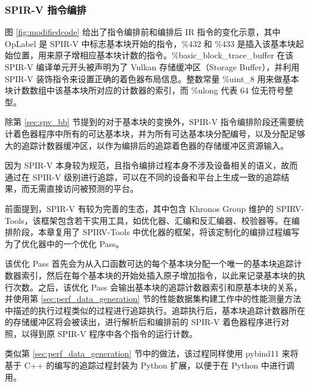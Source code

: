 \subsubsection{SPIR-V 指令编排}
\label{subsec:spv_instrumentation}

图 \ref{fig:modifiedcode} 给出了指令编排前和编排后 IR 指令的变化{\amend 示意}，其中 OpLabel 是 SPIR-V 中标志基本块开始的指令，\%432 和 \%433 是插入该基本块起始位置，用来原子增相应基本块计数的指令。\%basic\_block\_trace\_buffer 在该 SPIR-V 编译单元开头被声明为了 Vulkan 存储缓冲区（Storage Buffer），并利用 SPIR-V 装饰指令来设置正确的着色器布局信息。整数常量 \%uint\_8 用来做基本块计数数组中该基本块所对应的计数器的索引，而 \%ulong 代表 64 位无符号整型。

除第 \ref{sec:spv_bb} 节提到的对于基本块的变换外，SPIR-V 指令编排阶段还需要统计着色器程序中所有的可达基本块，并为所有可达基本块分配编号，以及分配足够大的追踪计数器缓冲区，以作为编排后的追踪着色器的存储缓冲区资源输入。

因为 SPIR-V 本身较为规范，且指令编排过程本身不涉及设备相关的语义，故而通过在 SPIR-V 级别进行追踪，可以在不同的设备和平台上生成一致的追踪结果，而无需直接访问被预测的平台。

前面提到，SPIR-V 有较为完善的生态，其中包含 Khronos Group 维护的 SPIRV-Tools，该框架包含若干实用工具，如优化器、汇编和反汇编器、校验器等。在编排阶段，本章复用了 SPIRV-Tools 中优化器的框架，将该定制化的编排过程{\amend 编写为了}优化器中的一个优化 Pass。

{\amend 该优化 Pass 首先会}为从入口函数可达的每个基本块分配一个唯一的基本块追踪计数器索引，然后在每个基本块的开始处插入原子增加指令，以此来记录基本块的执行次数。之后，该优化 Pass 会输出基本块的追踪计数器索引和原基本块的关系，并使用第 \ref{sec:perf_data_generation} 节{\amend 的性能数据集构建工作中}的性能测量方法中描述的执行过程类似的过程进行追踪执行。追踪执行后，基本块追踪计数器所在的存储缓冲区将会被读出，进行解析{\amend 后}和编排前的 SPIR-V 着色器程序进行对照，{\amend 以}得到原 SPIR-V 程序中各个指令的运行计数。

类似第 \ref{sec:perf_data_generation} 节中的做法，{\amend 该过程}同样使用 pybind11 来将{\amend 基于 C++ 的编写的追踪}过程封装为 Python 扩展，以便于在 Python 中进行调用。

